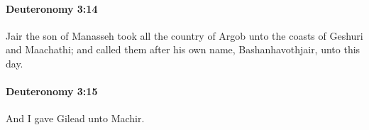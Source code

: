 		\paragraph{Deuteronomy 3:14} %
			\label{DEUTERONOMY-3-14}

			Jair the son of Manasseh took all the country of Argob unto the coasts of Geshuri and Maachathi; and called them after his own name, Bashanhavothjair, unto this day.


		\paragraph{Deuteronomy 3:15} %
			\label{DEUTERONOMY-3-15}

			And I gave Gilead unto Machir.


